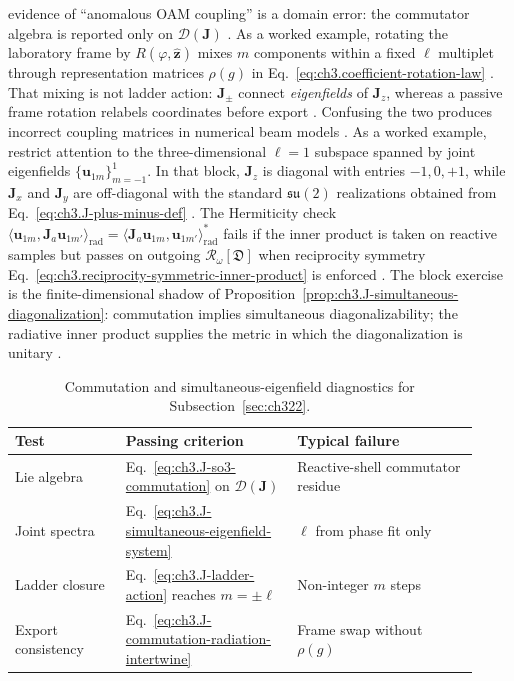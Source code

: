 evidence of ``anomalous OAM coupling'' is a domain error: the commutator algebra is reported only on
\(\mathcal{D}(\mathbf{J})\) .
As a worked example, rotating the laboratory frame by \(R(\varphi,\hat{\mathbf{z}})\) mixes \(m\) components within a fixed
\(\ell\) multiplet through representation matrices \(\rho(g)\) in
Eq.~\eqref{eq:ch3.coefficient-rotation-law} . That mixing is not ladder action:
\(\mathbf{J}_{\pm}\) connect \emph{eigenfields} of \(\mathbf{J}_{z}\), whereas a passive frame rotation
relabels coordinates before export . Confusing the two produces incorrect coupling matrices
in numerical beam models .
As a worked example, restrict attention to the three-dimensional \(\ell=1\) subspace spanned by joint eigenfields
\(\{\mathbf{u}_{1m}\}_{m=-1}^{1}\). In that block, \(\mathbf{J}_{z}\) is diagonal with entries
\(-1,0,+1\), while \(\mathbf{J}_{x}\) and \(\mathbf{J}_{y}\) are off-diagonal with the standard
\(\mathfrak{su}(2)\) realizations obtained from Eq.~\eqref{eq:ch3.J-plus-minus-def}
. The Hermiticity check
\(\langle \mathbf{u}_{1m},\mathbf{J}_{a}\mathbf{u}_{1m'}\rangle_{\mathrm{rad}}
=\langle \mathbf{J}_{a}\mathbf{u}_{1m},\mathbf{u}_{1m'}\rangle_{\mathrm{rad}}^{*}\)
fails if the inner product is taken on reactive samples but passes on outgoing
\(\mathcal{R}_\omega[\mathfrak{D}]\) when reciprocity symmetry
Eq.~\eqref{eq:ch3.reciprocity-symmetric-inner-product} is enforced . The
block exercise is the finite-dimensional shadow of Proposition~\ref{prop:ch3.J-simultaneous-diagonalization}:
commutation implies simultaneous diagonalizability; the radiative inner product supplies the metric in which
the diagonalization is unitary .
\begin{table}[t]
\centering
\caption{Commutation and simultaneous-eigenfield diagnostics for Subsection~\ref{sec:ch322}.}
\label{tab:ch3.J-commutation-diagnostics}
\small
\begin{tabular}{@{}p{0.22\linewidth}p{0.34\linewidth}p{0.36\linewidth}@{}}
\toprule
Test & Passing criterion & Typical failure \\
\midrule
Lie algebra &
Eq.~\eqref{eq:ch3.J-so3-commutation} on \(\mathcal{D}(\mathbf{J})\) &
Reactive-shell commutator residue \\
\addlinespace
Joint spectra &
Eq.~\eqref{eq:ch3.J-simultaneous-eigenfield-system} &
\(\ell\) from phase fit only \\
\addlinespace
Ladder closure &
Eq.~\eqref{eq:ch3.J-ladder-action} reaches \(m=\pm\ell\) &
Non-integer \(m\) steps \\
\addlinespace
Export consistency &
Eq.~\eqref{eq:ch3.J-commutation-radiation-intertwine} &
Frame swap without \(\rho(g)\) \\
\bottomrule
\end{tabular}
\end{table}
